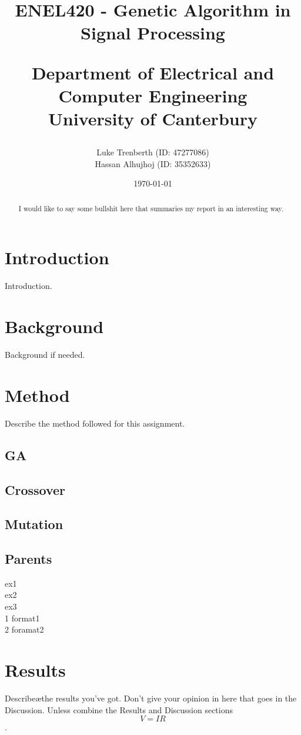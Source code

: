 \documentclass[a4paper, 12pt]{article}
\title{
    ENEL420 - Genetic Algorithm in Signal Processing\\
    \vspace{2cm}
    \begin{large} 
        Department of Electrical and Computer Engineering\\
        University of Canterbury\\
    \end{large}
    \vspace{2cm}
}
\author{
    \small {Luke Trenberth (ID: 47277086)}\\
    \small {Hassan Alhujhoj (ID: 35352633)}\\
    }
\date{\today}
\begin{document}
\maketitle

\begin{abstract}
    I would like to say some bullshit here that summaries my report in an interesting way.
\end{abstract}

\pagebreak
{}
\tableofcontents
{}
\pagebreak

\section{Introduction}\label{sec:intro}
    Introduction\cite{Ifeachor1995}.
\section{Background}\label{sec:bg}
    Background if needed\cite{Software2013}.

\section{Method}\label{sec:meth}
    Describe the method followed for this assignment.
    \subsection{GA}
    \subsection{Crossover}
    \subsection{Mutation}
    \subsection{Parents}
    \begin{flushleft}
        ex1\\
        ex2\\
        ex3\\
        1 format1\\
        2 foramat2\\
      \end{flushleft}

\section{Results}\label{sec:res}
    Describe\ae the results you've got. Don't give your opinion in here that goes in the Discussion.
    Unless combine the Results and Discussion sections \begin{equation} V = IR\end{equation}.
   
\end{document}
